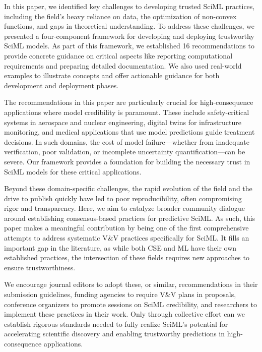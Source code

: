 \documentclass[a4paper,10pt]{article}
\begin{document}
In this paper, we identified key challenges to developing trusted SciML practices, including the field's heavy reliance on data, the optimization of non-convex functions, and gaps in theoretical understanding.
To address these challenges, we presented a four-component framework for developing and deploying trustworthy SciML models.
As part of this framework, we established 16 recommendations to provide concrete guidance on critical aspects like reporting computational requirements and preparing detailed documentation. We also used real-world examples to illustrate concepts and offer actionable guidance for both development and deployment phases.

The recommendations in this paper are particularly crucial for high-consequence applications where model credibility is paramount. 
These include safety-critical systems in aerospace and nuclear engineering, digital twins for infrastructure monitoring, and medical applications that use model predictions guide treatment decisions. In such domains, the cost of model failure---whether from inadequate verification, poor validation, or incomplete uncertainty quantification---can be severe. Our framework provides a foundation for building the necessary trust in SciML models for these critical applications.


Beyond these domain-specific challenges, the rapid evolution of the field and the drive to publish quickly have led to poor reproducibility, often compromising rigor and transparency.
Here, we aim to catalyze broader community dialogue around establishing consensus-based practices for predictive SciML.
As such, this paper makes a meaningful contribution by being one of the first comprehensive attempts to address systematic V\&V practices specifically for SciML.
It fills an important gap in the literature, as while both CSE and ML have their own established practices, the intersection of these fields requires new approaches to ensure trustworthiness.

We encourage journal editors to adopt these, or similar, recommendations in their submission guidelines, funding agencies to require V\&V plans in proposals, conference organizers to promote sessions on SciML credibility, and researchers to implement these practices in their work. 
Only through collective effort can we establish rigorous standards needed to fully realize SciML's potential for accelerating scientific discovery and enabling trustworthy predictions in high-consequence applications.
\end{document}
